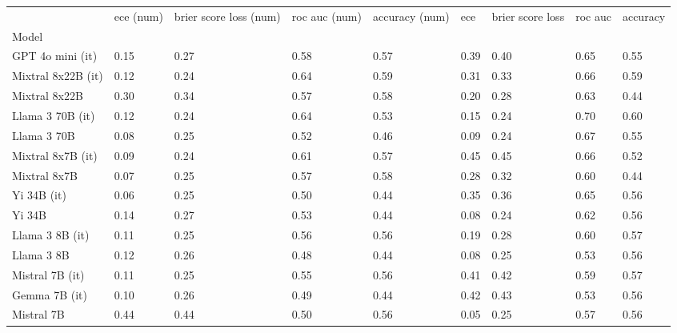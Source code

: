 \begin{tabular}{lllllllll}
\toprule
 & ece (num) & brier score loss (num) & roc auc (num) & accuracy (num) & ece & brier score loss & roc auc & accuracy \\
Model &  &  &  &  &  &  &  &  \\
\midrule
GPT 4o mini (it) & 0.15 & 0.27 & 0.58 & 0.57 & 0.39 & 0.40 & 0.65 & 0.55 \\
Mixtral 8x22B (it) & 0.12 & \cellcolor{cyan!23.7} 0.24 & \cellcolor{cyan!23.5} 0.64 & \cellcolor{cyan!25.0} 0.59 & 0.31 & 0.33 & 0.66 & \cellcolor{cyan!17.1} 0.59 \\
Mixtral 8x22B & 0.30 & 0.34 & 0.57 & \cellcolor{cyan!2.4} 0.58 & 0.20 & 0.28 & 0.63 & \cellcolor{orange!25.0} 0.44 \\
Llama 3 70B (it) & 0.12 & \cellcolor{cyan!22.5} 0.24 & \cellcolor{cyan!25.0} 0.64 & 0.53 & 0.15 & \cellcolor{cyan!22.6} 0.24 & \cellcolor{cyan!25.0} 0.70 & \cellcolor{cyan!25.0} 0.60 \\
Llama 3 70B & 0.08 & \cellcolor{cyan!12.4} 0.25 & 0.52 & 0.46 & 0.09 & \cellcolor{cyan!21.4} 0.24 & 0.67 & 0.55 \\
Mixtral 8x7B (it) & 0.09 & \cellcolor{cyan!25.0} 0.24 & 0.61 & 0.57 & \cellcolor{orange!25.0} 0.45 & \cellcolor{orange!25.0} 0.45 & 0.66 & 0.52 \\
Mixtral 8x7B & 0.07 & \cellcolor{cyan!16.2} 0.25 & 0.57 & \cellcolor{cyan!2.4} 0.58 & 0.28 & 0.32 & 0.60 & \cellcolor{orange!25.0} 0.44 \\
Yi 34B (it) & \cellcolor{cyan!3.7} 0.06 & \cellcolor{cyan!11.2} 0.25 & 0.50 & \cellcolor{orange!25.0} 0.44 & 0.35 & 0.36 & 0.65 & 0.56 \\
Yi 34B & 0.14 & 0.27 & 0.53 & \cellcolor{orange!25.0} 0.44 & \cellcolor{cyan!4.5} 0.08 & \cellcolor{cyan!25.0} 0.24 & 0.62 & 0.56 \\
Llama 3 8B (it) & 0.11 & \cellcolor{cyan!12.4} 0.25 & 0.56 & 0.56 & 0.19 & 0.28 & 0.60 & 0.57 \\
Llama 3 8B & 0.12 & 0.26 & \cellcolor{orange!25.0} 0.48 & \cellcolor{orange!25.0} 0.44 & 0.08 & \cellcolor{cyan!7.1} 0.25 & 0.53 & 0.56 \\
Mistral 7B (it) & 0.11 & \cellcolor{cyan!11.2} 0.25 & 0.55 & 0.56 & \cellcolor{orange!2.7} 0.41 & 0.42 & 0.59 & 0.57 \\
Gemma 7B (it) & 0.10 & \cellcolor{cyan!4.9} 0.26 & \cellcolor{orange!4.9} 0.49 & \cellcolor{orange!25.0} 0.44 & \cellcolor{orange!12.0} 0.42 & 0.43 & 0.53 & 0.56 \\
Mistral 7B & \cellcolor{orange!25.0} 0.44 & \cellcolor{orange!25.0} 0.44 & 0.50 & 0.56 & \cellcolor{cyan!22.5} 0.05 & \cellcolor{cyan!14.2} 0.25 & 0.57 & 0.56 \\

\end{tabular}
